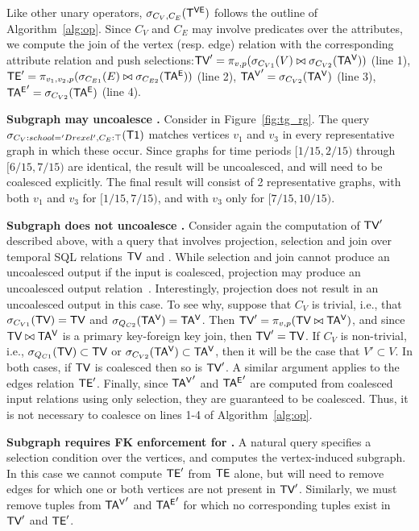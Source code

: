 Like other unary operators, $\sigma_{C_V, C_E} (\mathsf{T^{VE}})$ follows the
outline of Algorithm~\ref{alg:op}.  Since $C_V$ and $C_E$ may involve
predicates over the attributes, we compute the join of the vertex
(resp. edge) relation with the corresponding attribute relation and
push selections:$\textsf{TV}' = \pi_{v,p} (\sigma_{C_{V1}} (V) \bowtie
\sigma_{C_{V2}} (\mathsf{TA^{V}}))$ (line 1),$\textsf{TE}' = \pi_{v_1,v_2,p}
(\sigma_{C_{E1}} (E) \bowtie \sigma_{C_{E2}} (\mathsf{TA^{E}}))$ (line 2), $\mathsf{TA^{V}}'
= \sigma_{C_{V2}} (\mathsf{TA^{V}})$ (line 3), $\mathsf{TA^{E}}' = \sigma_{C_{V2}} (\mathsf{TA^{E}})$
(line 4).

{\bf Subgraph may uncoalesce \trg.} Consider  in
Figure~\ref{fig:tg_rg}.  The query
$\sigma_{C_V:{school='Drexel'},C_E:\top} (\textsf{T1})$ matches
vertices $v_1$ and $v_3$ in every representative graph in which these
occur.  Since graphs for time periods $[1/15,2/15)$ through
  $[6/15,7/15)$ are identical, the result will be uncoalesced, and
    will need to be coalesced explicitly.  The final result will
    consist of 2 representative graphs, with both $v_1$ and $v_3$ for
    $[1/15, 7/15)$, and with $v_3$ only for $[7/15, 10/15)$.

{\bf Subgraph does not uncoalesce \tve.}  Consider again the
computation of $\textsf{TV}'$ described above, with a query that involves
projection, selection and join over temporal SQL relations $\textsf{TV}$ and
\tav.  While selection and join cannot produce an uncoalesced output
if the input is coalesced, projection may produce an uncoalesced
output relation~\cite{DBLP:conf/vldb/BohlenSS96}.  Interestingly,
projection does not result in an uncoalesced output in this case. To
see why, suppose that $C_V$ is trivial, i.e., that $\sigma_{C_{V1}}
(\textsf{TV}) = \textsf{TV}$ and $\sigma_{Q_{C2}} (\mathsf{TA^{V}}) = \mathsf{TA^{V}}$. Then $\textsf{TV}' =
\pi_{v,p} (\textsf{TV} \bowtie \mathsf{TA^{V}})$, and since $\textsf{TV} \bowtie \mathsf{TA^{V}}$ is a
primary key-foreign key join, then $\textsf{TV}' = \textsf{TV}$.  If $C_V$ is
non-trivial, i.e., $\sigma_{Q_{C1}} (\textsf{TV}) \subset \textsf{TV}$ or
$\sigma_{C_{V2}} (\mathsf{TA^{V}}) \subset \mathsf{TA^{V}}$, then it will be the case that
$V' \subset V$.  In both cases, if $\textsf{TV}$ is coalesced then so is
$\textsf{TV}'$.  A similar argument applies to the edges relation $\textsf{TE}'$.
Finally, since $\mathsf{TA^{V}}'$ and $\mathsf{TA^{E}}'$ are computed from coalesced input
relations using only selection, they are guaranteed to be coalesced.
Thus, it is not necessary to coalesce on lines 1-4 of
Algorithm~\ref{alg:op}.

{\bf Subgraph requires FK enforcement for \tve.}  A natural query
specifies a selection condition over the vertices, and computes the
vertex-induced subgraph.  In this case we cannot compute $\textsf{TE}'$ from
$\textsf{TE}$ alone, but will need to remove edges for which one or both
vertices are not present in $\textsf{TV}'$.  Similarly, we must remove tuples
from $\mathsf{TA^{V}}'$ and $\mathsf{TA^{E}}'$ for which no corresponding tuples exist in
$\textsf{TV}'$ and $\textsf{TE}'$.

